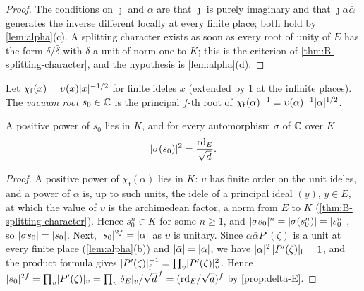 \begin{proof}
The conditions on $\jmath$ and $\alpha$ are that $\jmath$ is purely imaginary and that
$\jmath\alpha\bar\alpha$ generates the inverse different locally at every finite place; both hold by
\cref{lem:alpha}(c). A splitting character exists as soon as every root of unity of $E$ has the form
$\delta/\bar\delta$ with $\delta$ a unit of norm one to $K$; this is the criterion of
\cref{thm:B-splitting-character}, and the hypothesis is \cref{lem:alpha}(d).
\end{proof}

\begin{definition}\label{def:vacuum-root}
Let $\chi_{\mathrm f}(x)=\upsilon(x)\lvert x\rvert^{-1/2}$ for finite ideles $x$ (extended by $1$ at the
infinite places). The \emph{vacuum root} $s_0\in\mathbb{C}$ is the principal $f$-th root of
$\chi_{\mathrm f}(\alpha)^{-1}=\upsilon(\alpha)^{-1}\lvert \alpha\rvert^{1/2}$.
\end{definition}

\begin{proposition}\label{prop:vacuum-root}
A positive power of $s_0$ lies in $K$, and for every automorphism $\sigma$ of $\mathbb{C}$ over $K$
\[
  \lvert \sigma(s_0)\rvert^2=\frac{\mathrm{rd}_E}{\sqrt d}.
\]
\end{proposition}

\begin{proof}
A positive power of $\chi_{\mathrm f}(\alpha)$ lies in $K$: $\upsilon$ has finite order on the unit
ideles, and a power of $\alpha$ is, up to such units, the idele of a principal ideal $(y)$, $y\in E$,
at which the value of $\upsilon$ is the archimedean factor, a norm from $E$ to $K$
(\cref{thm:B-splitting-character}). Hence $s_0^n\in K$ for some $n\ge1$, and $\lvert \sigma s_0\rvert^n=
\lvert \sigma(s_0^n)\rvert=\lvert s_0^n\rvert$, so $\lvert \sigma s_0\rvert=\lvert s_0\rvert$. Next, $\lvert s_0\rvert^{2f}=\lvert \alpha\rvert$ as
$\upsilon$ is unitary. Since $\alpha\bar\alpha P'(\zeta)$ is a unit at every finite place
(\cref{lem:alpha}(b)) and $\lvert \bar\alpha\rvert=\lvert \alpha\rvert$, we have
$\lvert \alpha\rvert^2\,\lvert P'(\zeta)\rvert_{\mathrm f}=1$, and the product formula gives
$\lvert P'(\zeta)\rvert_{\mathrm f}^{-1}=\prod_v\lvert P'(\zeta)\rvert_v^2$. Hence
$\lvert s_0\rvert^{2f}=\prod_v\lvert P'(\zeta)\rvert_v=\prod_v\lvert \delta_E\rvert_v/\sqrt d^{\,f}=(\mathrm{rd}_E/\sqrt d)^f$ by
\cref{prop:delta-E}.
\end{proof}

